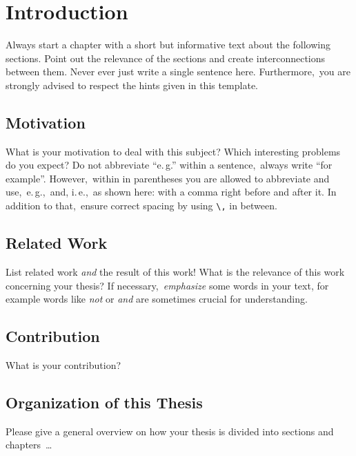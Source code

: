 \thispagestyle{firstPageOfChapter}
\chapter{Introduction} \label{chap:intro}
Always start a chapter with a short but informative text about the following sections\@. Point out the relevance of the sections and create interconnections between them\@. Never ever just write a single sentence here\@. Furthermore,\ you are strongly advised to respect the hints given in this template\@.

\section{Motivation}
What is your motivation to deal with this subject\@? Which interesting problems do you expect\@? Do not abbreviate \enquote{e.\,g.\/} within a sentence,\ always write \enquote{for example}\@. However,\ within in parentheses you are allowed to abbreviate and use,\ e.\,g.,\ and, i.\,e.,\ as shown here: with a comma right before and after it\@. In addition to that,\ ensure correct spacing by using \texttt{\textbackslash,} in between\@.

\section{Related Work}
List related work \emph{and} the result of this work\@! What is the relevance of this work concerning your thesis\@? If necessary,\ \emph{emphasize} some words in your text, for example words like \emph{not} or \emph{and} are sometimes crucial for understanding\@.

\section{Contribution}
What is your contribution?

\section{Organization of this Thesis}
Please give a general overview on how your thesis is divided into sections and chapters~\dots


